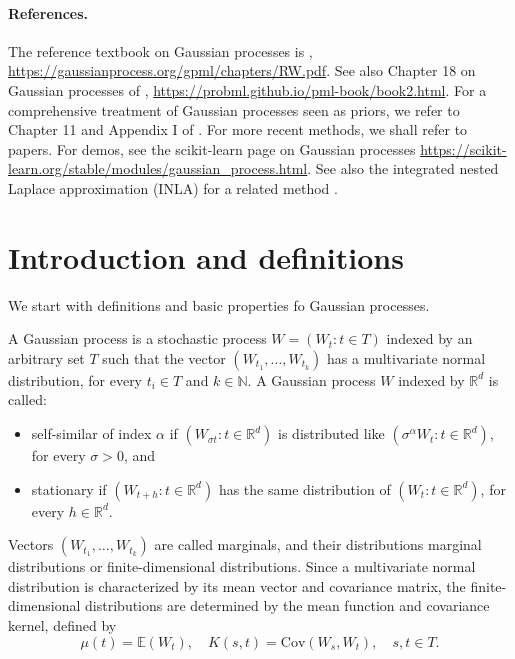 

\paragraph{References.} 
The reference textbook on Gaussian processes is \citet{Rasmussen:2006aa}, \url{https://gaussianprocess.org/gpml/chapters/RW.pdf}. See also Chapter 18 on Gaussian processes of \citet{murphy2023probabilisticMLadvanced}, \url{https://probml.github.io/pml-book/book2.html}. 
For a comprehensive treatment of Gaussian processes seen as priors, we refer to Chapter 11 and Appendix I of \citet{ghosal2017fundamentals}. 
For more recent methods, we shall refer to papers.
For demos, see the scikit-learn page on Gaussian processes \url{https://scikit-learn.org/stable/modules/gaussian_process.html}.
See also the integrated nested Laplace approximation (INLA) for a related method \citep{rue2009approximate}.




\section{Introduction and definitions}

We start with definitions and basic properties fo Gaussian processes. 


\begin{definition}%
	A \alert{Gaussian process} is a stochastic process $W =(W_t: t \in T)$ indexed by an arbitrary set $T$ such that the vector $(W_{t_1},\ldots,W_{t_k})$ has a multivariate
normal distribution, for every $t_i\in T$ and $k\in \mathbb{N}$. A Gaussian process $W$ indexed by $\mathbb{R}^d$ is called:
\begin{itemize}
	\item  \alert{self-similar} of index $\alpha$ if $(W_{\sigma t}:t \in \mathbb{R}^d)$ is distributed like $(\sigma^\alpha W_{t}:t \in \mathbb{R}^d)$, for every $\sigma  > 0$, and 
	\item \alert{stationary} if $(W_{t+h}:t \in \mathbb{R}^d)$  has the same distribution of $(W_{t}:t \in \mathbb{R}^d)$, for every $h\in \mathbb{R}^d$.
\end{itemize}
\end{definition}



Vectors $(W_{t_1},\ldots,W_{t_k})$ are called \alert{marginals}, and their distributions \alert{marginal distributions} or \alert{finite-dimensional distributions}. Since a multivariate normal distribution is characterized by its mean vector and covariance matrix, the finite-dimensional distributions are determined by the \alert{mean function} and \alert{covariance kernel}, defined by
$$\mu(t) = \mathbb{E}(W_t), \quad 
K(s, t) = \text{Cov}(W_s, W_t), \quad s, t \in  T.$$

